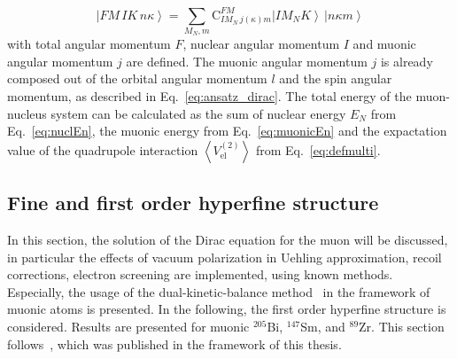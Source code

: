 \begin{equation}
\label{eq:totalState}
\left| FM\,IK\,n\kappa\right> = \sum_{M_N, m}\text{C}^{FM}_{IM_N\,j(\kappa)m}\left|IM_NK\right>\,\left|n\kappa m\right>
\end{equation}
with total angular momentum $F$, nuclear angular momentum $I$ and muonic angular momentum $j$ are defined. The muonic angular momentum $j$ is already composed out of the orbital angular momentum $l$ and the spin angular momentum, as described in Eq.~\eqref{eq:ansatz_dirac}. The total energy of the muon-nucleus system can be calculated as the sum of nuclear energy $E_N$ from Eq.~\eqref{eq:nuclEn}, the muonic energy from Eq.~\eqref{eq:muonicEn} and the expactation value of the quadrupole interaction $\left<V_{\text{el}}^{(2)}\right>$ from Eq.~\eqref{eq:defmulti}.

\subsection{Fine and first order hyperfine structure}
\label{sec:muon_finestructure}
In this section, the solution of the Dirac equation for the muon will be discussed, in particular the effects of vacuum polarization in Uehling approximation, recoil corrections, electron screening are implemented, using known methods. Especially, the usage of the dual-kinetic-balance method~\cite{Shabaev2004} in the framework of muonic atoms is presented. In the following, the first order hyperfine structure is considered. Results are presented for muonic $^{205}$Bi, $^{147}$Sm, and $^{89}$Zr. This section follows~\cite{michel2017}, which was published in the framework of this thesis.

